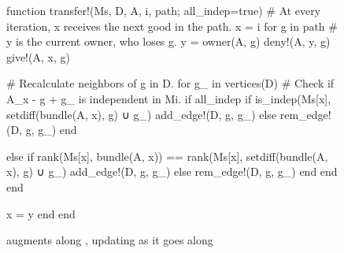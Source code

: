 \begin{figure}
\begin{jllisting}

  function transfer!(Ms, D, A, i, path; all_indep=true)
  # At every iteration, x receives the next good in the path.
  x = i
  for g in path
    # y is the current owner, who loses g.
    y = owner(A, g)
    deny!(A, y, g)
    give!(A, x, g)

    # Recalculate neighbors of g in D.
    for g_ in vertices(D)
      # Check if A_x - g + g_ is independent in Mi.
      if all_indep
        if is_indep(Ms[x], setdiff(bundle(A, x), g) ∪ g_)
          add_edge!(D, g, g_)
        else
          rem_edge!(D, g, g_)
        end
        
      else
        if rank(Ms[x], bundle(A, x)) == rank(Ms[x], setdiff(bundle(A, x), g) ∪ g_)
          add_edge!(D, g, g_)
        else
          rem_edge!(D, g, g_)
        end
      end
    end

    x = y
  end
end

\end{jllisting}
\caption{ augments  along , updating  as it goes along}
\label{code:transfer}
\end{figure}